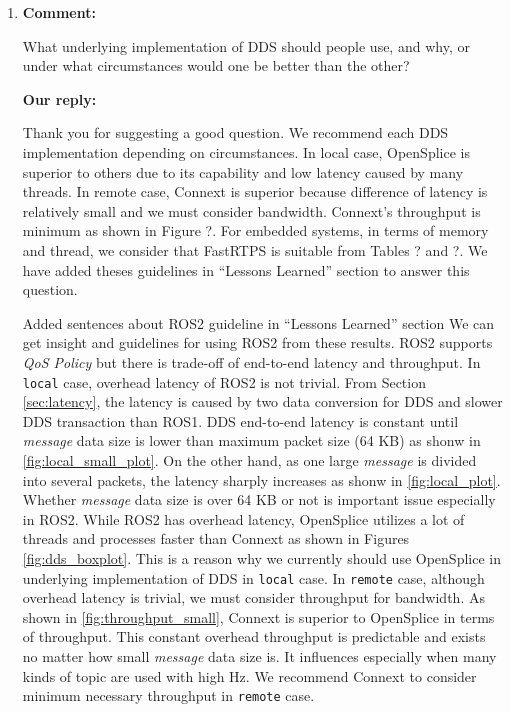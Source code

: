 \documentclass{article}
\begin{document}
\begin{enumerate}
\item \begin{flushleft}
    \textbf{Comment:}
  \end{flushleft}
  What underlying implementation of DDS should people use, and why, or under what circumstances would one be better than the other? 

  \begin{flushleft}
    \textbf{Our reply:}
  \end{flushleft}
  Thank you for suggesting a good question.
  We recommend each DDS implementation depending on circumstances.
  In local case, OpenSplice is superior to others due to its capability and low latency caused by many threads.
  In remote case, Connext is superior because difference of latency is relatively small and we must consider bandwidth.
  Connext's throughput is minimum as shown in Figure ?.
  For embedded systems, in terms of memory and thread, we consider that FastRTPS is suitable from Tables ? and ?.
  We have added theses guidelines in ``Lessons Learned'' section to answer this question.
  \begin{itembox}[|]{Added sentences about ROS2 guideline in ``Lessons Learned'' section}
    We can get insight and guidelines for using ROS2 from these results.
    ROS2 supports \emph{QoS Policy} but there is trade-off of end-to-end latency and throughput.
    In \texttt{local} case, overhead latency of ROS2 is not trivial.
    From Section \ref{sec:latency}, the latency is caused by two data conversion for DDS and slower DDS transaction than ROS1.
    DDS end-to-end latency is constant until \emph{message} data size is lower than maximum packet size (64 KB) as shonw in \ref{fig:local_small_plot}.
    On the other hand, as one large \emph{message} is divided into several packets, the latency sharply increases as shonw in \ref{fig:local_plot}.
    Whether \emph{message} data size is over 64 KB or not is important issue especially in ROS2.
    While ROS2 has overhead latency, OpenSplice utilizes a lot of threads and processes faster than Connext as shown in Figures \ref{fig:dds_boxplot}.
    This is a reason why we currently should use OpenSplice in underlying implementation of DDS in \texttt{local} case.
    In \texttt{remote} case, although overhead latency is trivial, we must consider throughput for bandwidth.
    As shown in \ref{fig:throughput_small}, Connext is superior to OpenSplice in terms of throughput.
    This constant overhead throughput is predictable and exists no matter how small \emph{message} data size is.
    It influences especially when many kinds of topic are used with high Hz.
    We recommend Connext to consider minimum necessary throughput in \texttt{remote} case.
  \end{itembox}\\


\end{enumerate}
\end{document}
